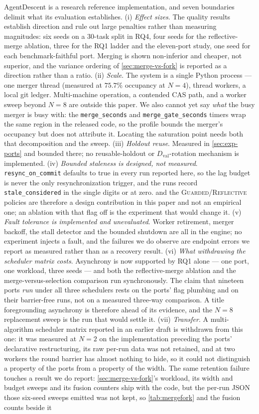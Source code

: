 \documentclass{article}
\newcommand{\code}[1]{\texttt{#1}}
\newcommand{\Dval}{D_{\mathrm{val}}}
\begin{document}
AgentDescent is a research reference implementation, and seven boundaries delimit what its evaluation establishes. (i) \emph{Effect sizes}. The quality results establish direction and rule out large penalties rather than measuring magnitudes: six seeds on a 30-task split in RQ4, four seeds for the reflective-merge ablation, three for the RQ1 ladder and the eleven-port study, one seed for each benchmark-faithful port. Merging is shown non-inferior and cheaper, not superior, and the variance ordering of \cref{sec:merge-vs-fork} is reported as a direction rather than a ratio. (ii) \emph{Scale}. The system is a single Python process --- one merger thread (measured at $75.7\%$ occupancy at $N{=}4$), thread workers, a local git ledger. Multi-machine operation, a contended CAS path, and a worker sweep beyond $N{=}8$ are outside this paper. We also cannot yet say \emph{what} the busy merger is busy with: the \code{merge\_seconds} and \code{merge\_gate\_seconds} timers wrap the same region in the released code, so the profile bounds the merger's occupancy but does not attribute it. Locating the saturation point needs both that decomposition and the sweep. (iii) \emph{Holdout reuse}. Measured in \cref{sec:exp-ports} and bounded there; no reusable-holdout or $\Dval$-rotation mechanism is implemented. (iv) \emph{Bounded staleness is designed, not measured}. \code{resync\_on\_commit} defaults to true in every run reported here, so the lag budget is never the only resynchronization trigger, and the runs record \code{stale\_considered} in the single digits or at zero.  and the \textsc{Guarded}/\textsc{Reflective} policies are therefore a design contribution in this paper and not an empirical one; an ablation with that flag off is the experiment that would change it. (v) \emph{Fault tolerance is implemented and unevaluated}. Worker retirement, merger backoff, the stall detector and the bounded shutdown are all in the engine; no experiment injects a fault, and the failures we do observe are endpoint errors we report as measured rather than as a recovery result. (vi) \emph{What withdrawing the scheduler matrix costs}. Asynchrony is now supported by RQ1 alone --- one port, one workload, three seeds --- and both the reflective-merge ablation and the merge-versus-selection comparison run synchronously. The claim that nineteen ports \emph{run} under all three schedulers rests on the ports' flag plumbing and on their barrier-free runs, not on a measured three-way comparison. A title foregrounding asynchrony is therefore ahead of its evidence, and the $N{=}8$ replacement sweep is the run that would settle it. (vii) \emph{Transfer}. A multi-algorithm scheduler matrix reported in an earlier draft is withdrawn from this one: it was measured at $N{=}2$ on the implementation preceding the ports' declarative restructuring, its raw per-run data was not retained, and at two workers the round barrier has almost nothing to hide, so it could not distinguish a property of the ports from a property of the width. The same retention failure touches a result we do report: \cref{sec:merge-vs-fork}'s workload, its width and budget sweeps and its fusion counters ship with the code, but the per-run JSON those six-seed sweeps emitted was not kept, so \cref{tab:mergefork} and the fusion counts beside it 
\end{document}
